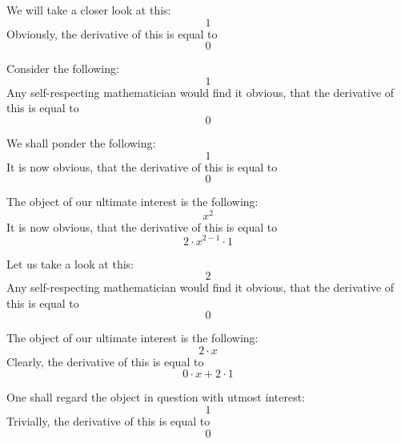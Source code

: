 \documentclass{article}
\begin{document}
We will take a closer look at this:
\begin{equation}
1 
\end{equation}
Obviously, the derivative of this is equal to
\begin{equation}
0 
\end{equation}

Consider the following:
\begin{equation}
1 
\end{equation}
Any self-respecting mathematician would find it obvious, that the derivative of this is equal to
\begin{equation}
0 
\end{equation}

We shall ponder the following:
\begin{equation}
1 
\end{equation}
It is now obvious, that the derivative of this is equal to
\begin{equation}
0 
\end{equation}

The object of our ultimate interest is the following:
\begin{equation}
x ^{2 } 
\end{equation}
It is now obvious, that the derivative of this is equal to
\begin{equation}
2 \cdot x ^{2 - 1 } \cdot 1 
\end{equation}

Let us take a look at this:
\begin{equation}
2 
\end{equation}
Any self-respecting mathematician would find it obvious, that the derivative of this is equal to
\begin{equation}
0 
\end{equation}

The object of our ultimate interest is the following:
\begin{equation}
2 \cdot x 
\end{equation}
Clearly, the derivative of this is equal to
\begin{equation}
0 \cdot x + 2 \cdot 1 
\end{equation}

One shall regard the object in question with utmost interest:
\begin{equation}
1 
\end{equation}
Trivially, the derivative of this is equal to
\begin{equation}
0 
\end{equation}
\end{document}
